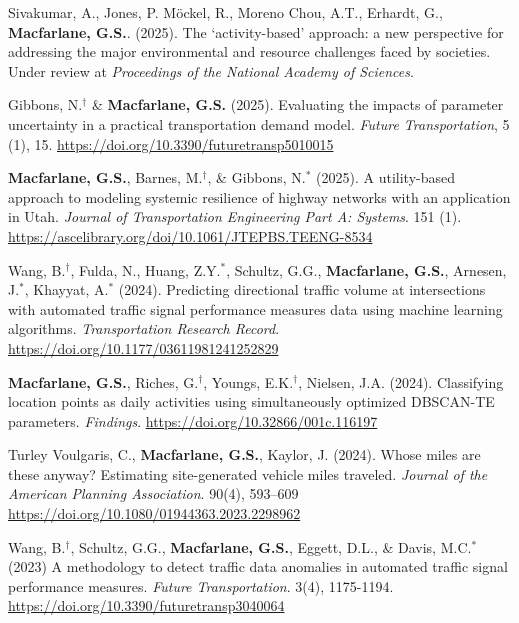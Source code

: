 \documentclass[margin,line]{res}
\newif\ifdetail
\newcounter{enuminitialize}
\newenvironment{myenum}[1][]
{%
 \setcounter{enuminitialize}{#1}
 \addtocounter{enuminitialize}{2}
 \begin{enumerate}[left= 4pt, itemsep=8pt, start=\value{enuminitialize}, label=\arabic*\addtocounter{enumi}{-2}]
}
{%
 \end{enumerate}
}
\begin{document}
\begin{resume}
\begin{myenum}[26]
{  \item Sivakumar, A., Jones, P. M\"ockel, R., Moreno Chou, A.T., Erhardt, G.,
  \textbf{Macfarlane, G.S.}. (2025). The ‘activity-based’ approach: a new
  perspective for addressing the major environmental and resource challenges
  faced by societies. Under review at \textit{Proceedings of the National Academy of Sciences}. 

  \item Gibbons, N.$^\dagger$  \& \textbf{Macfarlane, G.S.} (2025). 
  Evaluating the impacts of parameter uncertainty in a practical transportation
  demand model. \textit{Future Transportation}, 5 (1), 15. \url{https://doi.org/10.3390/futuretransp5010015}

  \item \textbf{Macfarlane, G.S.}, Barnes, M.$^\dagger$, \& Gibbons, N.$^*$ (2025). 
  A utility-based approach to modeling systemic resilience of highway networks with an application in Utah.
  \textit{Journal of Transportation Engineering Part A: Systems}. 151 (1). \url{https://ascelibrary.org/doi/10.1061/JTEPBS.TEENG-8534}

  \item Wang, B.$^\dagger$, Fulda, N., Huang, Z.Y.$^*$, Schultz, G.G., \textbf{Macfarlane, G.S.}, Arnesen, J.$^*$, Khayyat, A.$^*$ (2024). 
  Predicting directional traffic volume at intersections with automated traffic signal performance measures data using machine learning algorithms.
 \textit{Transportation Research Record}. \url{https://doi.org/10.1177/03611981241252829}

  \item \textbf{Macfarlane, G.S.}, Riches, G.$^\dagger$, Youngs, E.K.$^\dagger$,
  Nielsen, J.A. (2024). Classifying location points as daily activities using
  simultaneously optimized DBSCAN-TE parameters.  \textit{Findings}.
  \url{https://doi.org/10.32866/001c.116197}

  \item Turley Voulgaris, C., \textbf{Macfarlane, G.S.}, Kaylor, J. (2024).
  Whose miles are these anyway? Estimating site-generated vehicle miles traveled.
  \textit{Journal of the American Planning Association}. 90(4), 593--609 \url{https://doi.org/10.1080/01944363.2023.2298962}

  \item  Wang, B.$^\dagger$, Schultz, G.G., \textbf{Macfarlane, G.S.}, Eggett, D.L., 
  \& Davis, M.C.$^*$ (2023) A methodology to detect traffic data anomalies in automated traffic 
  signal performance measures. \textit{Future Transportation}. 3(4), 1175-1194. \url{https://doi.org/10.3390/futuretransp3040064} 
  \ifdetail Citations: 2 \fi

}
\end{myenum}
\end{resume}
\end{document}
